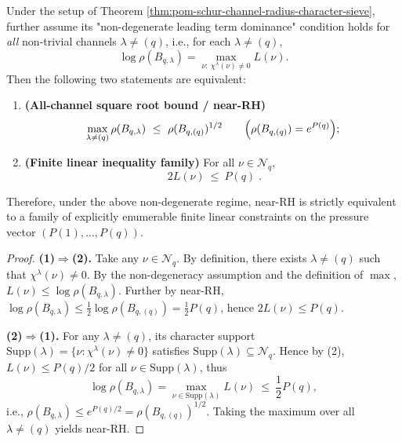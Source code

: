 \begin{theorem}\label{thm:pom-schur-near-rh-linear-inequality-complete}
Under the setup of Theorem \ref{thm:pom-schur-channel-radius-character-sieve},
further assume its "non-degenerate leading term dominance" condition holds for \emph{all} non-trivial channels \(\lambda\neq(q)\),
i.e., for each \(\lambda\neq(q)\),
\[
\log\rho(B_{q,\lambda})=\max_{\nu:\ \chi^\lambda(\nu)\neq0} L(\nu).
\]
Then the following two statements are equivalent:
\begin{enumerate}
  \item \textbf{(All-channel square root bound / near-RH)}
  \[
  \max_{\lambda\neq(q)}\rho(B_{q,\lambda})\ \le\ \rho(B_{q,(q)})^{1/2}
  \qquad\Bigl(\rho(B_{q,(q)})=e^{P(q)}\Bigr);
  \]
  \item \textbf{(Finite linear inequality family)} For all \(\nu\in\mathcal{N}_q\),
  \[
  \boxed{\;2L(\nu)\ \le\ P(q)\; }.
  \]
\end{enumerate}
Therefore, under the above non-degenerate regime, near-RH is strictly equivalent to a family of explicitly enumerable finite linear constraints on the pressure vector \((P(1),\dots,P(q))\).
\end{theorem}
\begin{proof}
\textbf{(1)\(\Rightarrow\)(2).}
Take any \(\nu\in\mathcal{N}_q\).
By definition, there exists \(\lambda\neq(q)\) such that \(\chi^\lambda(\nu)\neq0\).
By the non-degeneracy assumption and the definition of \(\max\),
\(
L(\nu)\le \log\rho(B_{q,\lambda})
\).
Further by near-RH, \(\log\rho(B_{q,\lambda})\le \frac12\log\rho(B_{q,(q)})=\frac12P(q)\),
hence \(2L(\nu)\le P(q)\).
\par
\textbf{(2)\(\Rightarrow\)(1).}
For any \(\lambda\neq(q)\), its character support
\(
\mathrm{Supp}(\lambda)=\{\nu:\chi^\lambda(\nu)\neq0\}
\)
satisfies \(\mathrm{Supp}(\lambda)\subseteq\mathcal{N}_q\).
Hence by (2), \(L(\nu)\le P(q)/2\) for all \(\nu\in\mathrm{Supp}(\lambda)\),
thus
\[
\log\rho(B_{q,\lambda})
=\max_{\nu\in\mathrm{Supp}(\lambda)} L(\nu)\ \le\ \frac12P(q),
\]
i.e., \(\rho(B_{q,\lambda})\le e^{P(q)/2}=\rho(B_{q,(q)})^{1/2}\).
Taking the maximum over all \(\lambda\neq(q)\) yields near-RH.
\end{proof}

